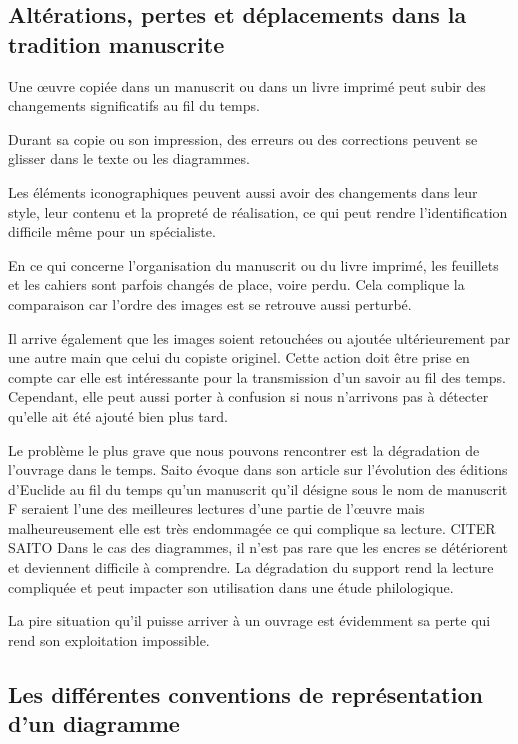 \subsection{Altérations, pertes et déplacements dans la tradition manuscrite}

Une œuvre copiée dans un manuscrit ou dans un livre imprimé peut subir des changements significatifs au fil du temps.

Durant sa copie ou son impression, des erreurs ou des corrections peuvent se glisser dans le texte ou les diagrammes.

Les éléments iconographiques peuvent aussi avoir des changements dans leur style, leur contenu et la propreté de réalisation, ce qui peut rendre l'identification difficile même pour un spécialiste. 

En ce qui concerne l'organisation du manuscrit ou du livre imprimé, les feuillets et les cahiers sont parfois changés de place, voire perdu. Cela complique la comparaison car l'ordre des images est se retrouve aussi perturbé. 

Il arrive également que les images soient retouchées ou ajoutée ultérieurement par une autre main que celui du copiste originel. Cette action doit être prise en compte car elle est intéressante pour la transmission d'un savoir au fil des temps. Cependant, elle peut aussi porter à confusion si nous n'arrivons pas à détecter qu'elle ait été ajouté bien plus tard.

Le problème le plus grave que nous pouvons rencontrer est la dégradation de l'ouvrage dans le temps. Saito évoque dans son article sur l'évolution des éditions d'Euclide au fil du temps qu'un manuscrit qu'il désigne sous le nom de \og manuscrit F \fg seraient l'une des meilleures lectures d'une partie de l'œuvre mais malheureusement elle est très endommagée ce qui complique sa lecture. CITER SAITO Dans le cas des diagrammes, il n'est pas rare que les encres se détériorent et deviennent difficile à comprendre. La dégradation du support rend la lecture compliquée et peut impacter son utilisation dans une étude philologique.

La pire situation qu'il puisse arriver à un ouvrage est évidemment sa perte qui rend son exploitation impossible.



\subsection{Les différentes conventions de représentation d'un diagramme}

